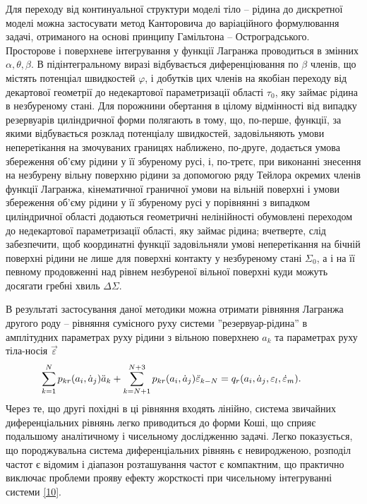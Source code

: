 \documentclass[11pt, reqno]{amsart}
\begin{document}
Для переходу від континуальної структури моделі тіло -- рідина до дискретної моделі можна застосувати метод Канторовича до варіаційного формулювання задачі, отриманого на основі принципу Гамільтона -- Остроградського. Просторове і поверхневе інтегрування у функції Лагранжа проводиться в змінних $\alpha, \theta, \beta$. В підінтегральному виразі відбувається диференціювання по $\beta$  членів, що містять потенціал швидкостей $\varphi$, і добутків цих членів на якобіан переходу від декартової геометрії до недекартової параметризації області $\tau_0$, яку займає рідина в незбуреному стані. Для порожнини обертання в цілому відмінності від випадку резервуарів циліндричної форми полягають в тому, що, по-перше, функції, за якими відбувається розклад потенціалу швидкостей, задовільняють умови неперетікання на змочуваних границях наближено, по-друге, додається умова збереження об'єму рідини у її збуреному русі, і, по-третє, при виконанні знесення на незбурену вільну поверхню рідини за допомогою ряду Тейлора окремих членів функції Лагранжа, кінематичної граничної умови на вільній поверхні і умови збереження об'єму рідини у її збуреному русі у порівнянні з випадком циліндричної області додаються геометричні нелінійності обумовлені переходом до недекартової параметризації області, яку займає рідина; вчетверте, слід забезпечити, щоб координатні функції задовільняли умові неперетікання на бічній поверхні рідини не лише для поверхні контакту у незбуреному стані $\Sigma_0$, а і на її певному продовженні над рівнем незбуреної вільної поверхні куди можуть досягати гребні хвиль $\Delta \Sigma$.

В результаті застосування даної методики можна отримати рівняння Лагранжа другого роду --  рівняння сумісного руху системи ''резервуар-рідина'' в амплітудних параметрах руху рідини з вільною поверхнею $a_k$ та параметрах руху тіла-носія ${\vec \varepsilon}$
\begin{eqnarray}\label{10}
    &&\hskip-12mm\sum_{k=1}^N p_{kr}(a_i,\dot a_j) \ddot a_k +\sum_{k=N+1}^{N+3} p_{kr} (a_i,\dot a_j) \ddot {\varepsilon}_{k-N}=q_r(a_i, \dot a_j, \varepsilon_l, \dot \varepsilon_m).
\end{eqnarray}
Через те, що другі похідні в ці рівняння входять лінійно, система звичайних диференціальних рівнянь легко приводиться до форми Коші, що сприяє подальшому аналітичному і чисельному дослідженню задачі. Легко показується, що породжувальна система диференціальних рівнянь є невиродженою, розподіл частот є відомим і діапазон розташування частот є компактним, що практично виключає проблеми прояву ефекту жорсткості при чисельному інтегруванні системи \eqref{10}.
\end{document}
